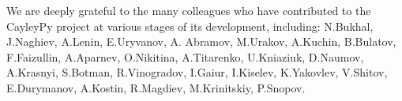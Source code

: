 \documentclass[atmp]{ipart_v1}
\numberwithin{equation}{section}
\theoremstyle{plain}%
\begin{document}
We are deeply grateful to the many colleagues who have contributed to the CayleyPy project at various stages of its development, including: N.Bukhal, J.Naghiev, A.Lenin, E.Uryvanov,  A. Abramov, M.Urakov, A.Kuchin,  B.Bulatov,  F.Faizullin, A.Aparnev, O.Nikitina, A.Titarenko, U.Kniaziuk, D.Naumov, A.Krasnyi, S.Botman,
R.Vinogradov, I.Gaiur, I.Kiselev,  %
K.Yakovlev, V.Shitov, E.Durymanov, A.Kostin, R.Magdiev, M.Krinitskiy, P.Snopov. 






\end{document}
